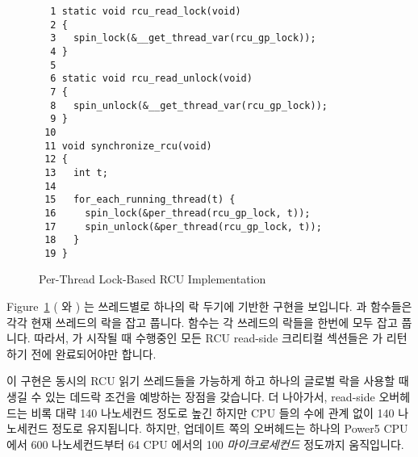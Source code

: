 \begin{figure}[bp]
{ \scriptsize
\begin{verbatim}
  1 static void rcu_read_lock(void)
  2 {
  3   spin_lock(&__get_thread_var(rcu_gp_lock));
  4 }
  5
  6 static void rcu_read_unlock(void)
  7 {
  8   spin_unlock(&__get_thread_var(rcu_gp_lock));
  9 }
 10
 11 void synchronize_rcu(void)
 12 {
 13   int t;
 14
 15   for_each_running_thread(t) {
 16     spin_lock(&per_thread(rcu_gp_lock, t));
 17     spin_unlock(&per_thread(rcu_gp_lock, t));
 18   }
 19 }
\end{verbatim}
}
\caption{Per-Thread Lock-Based RCU Implementation}
\label{fig:defer:Per-Thread Lock-Based RCU Implementation}
\end{figure}

Figure~\ref{fig:defer:Per-Thread Lock-Based RCU Implementation}
( 와 )
는 쓰레드별로 하나의 락 두기에 기반한 구현을 보입니다.
 과  함수들은 각각 현재 쓰레드의 락을
잡고 풉니다.
 함수는 각 쓰레드의 락들을 한번에 모두 잡고 풉니다.
따라서,  가 시작될 때 수행중인 모든 RCU read-side
크리티컬 섹션들은  가 리턴하기 전에 완료되어야만 합니다.
\iffalse

Figure~\ref{fig:defer:Per-Thread Lock-Based RCU Implementation}
(\co{rcu_lock_percpu.h} and \co{rcu_lock_percpu.c})
shows an implementation based on one lock per thread.
The \co{rcu_read_lock()} and \co{rcu_read_unlock()} functions
acquire and release, respectively, the current thread's lock.
The \co{synchronize_rcu()} function acquires and releases each thread's
lock in turn.
Therefore, all RCU read-side critical sections running
when \co{synchronize_rcu()} starts must have completed before
\co{synchronize_rcu()} can return.
\fi

이 구현은 동시의 RCU 읽기 쓰레드들을 가능하게 하고 하나의 글로벌 락을 사용할 때
생길 수 있는 데드락 조건을 예방하는 장점을 갖습니다.
더 나아가서, read-side 오버헤드는 비록 대략 140 나노세컨드 정도로 높긴 하지만
CPU 들의 수에 관계 없이 140 나노세컨드 정도로 유지됩니다.
하지만, 업데이트 쪽의 오버헤드는 하나의 Power5 CPU 에서 600 나노세컨드부터 64
CPU 에서의 100 \emph{마이크로세컨드} 정도까지 움직입니다.
\iffalse

This implementation does have the virtue of permitting concurrent
RCU readers, and does avoid the deadlock condition that can arise
with a single global lock.
Furthermore, the read-side overhead, though high at roughly 140 nanoseconds,
remains at about 140 nanoseconds regardless of the number of CPUs.
However, the update-side overhead ranges from about 600 nanoseconds
on a single Power5 CPU
up to more than 100 \emph{microseconds} on 64 CPUs.
\fi

